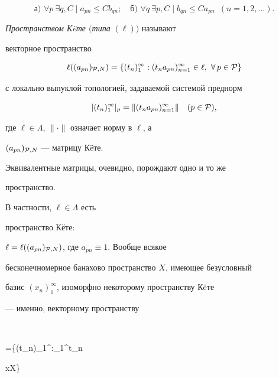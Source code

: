 $$


\text{а)\ } \forall p\  \exists q,C\mid a_{pn}\leq


Cb_{qn};\quad


\text{б)\ } \forall q\  \exists p,C\mid b_{qn} \leq Ca_{pn}\ \;


(n=1,2,\dotsc).


$$





{\it Пространством К\"eте $($типа $(\ell))$} называют


векторное пространство


$$


\ell((a_{pn})_{{\cal P},N})=\{(t_n)_1^\infty:


(t_na_{pn})_{n=1}^\infty\in \ell,\


\forall\, p\in{\cal P}\}


$$


с локально выпуклой топологией, задаваемой системой преднорм


$$


|(t_n)_1^\infty|_p=\|(t_na_{pn})_{n=1}^\infty\|\quad


(p\in{\cal P}),


$$


где $\ell\in\Lambda$, $\|\cdot\|$ означает норму в $\ell$, а


$(a_{pn})_{{\cal P},N}$ --- матрицу К\"eте.





Эквивалентные матрицы, очевидно, порождают одно и то же


пространство.





В частности, $\ell\in\Lambda$ есть


пространство Кёте:


$\ell=\ell((a_{pn})_{{\cal P},N})$, где $a_{pn}\equiv 1$. Вообще всякое


бесконечномерное банахово пространство $X$, имеющее безусловный


базис $(x_n)_1^\infty$, изоморфно некоторому пространству К\"eте


--- именно, векторному пространству


$$


\ell=\biggl\{(t_n)_1^\infty:\sum_1^\infty t_n


 x\in X\biggr\}


